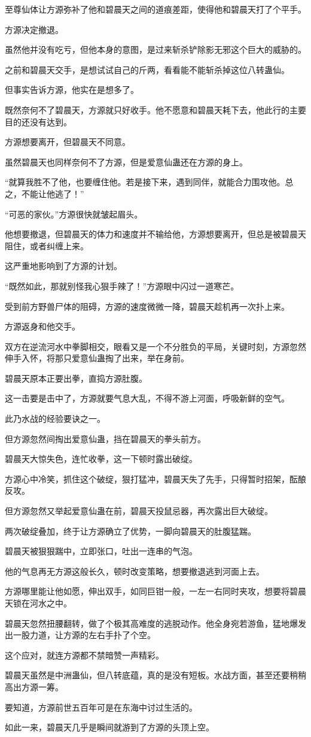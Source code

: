 \begin{this_body}
至尊仙体让方源弥补了他和碧晨天之间的道痕差距，使得他和碧晨天打了个平手。

方源决定撤退。

虽然他并没有吃亏，但他本身的意图，是过来斩杀铲除影无邪这个巨大的威胁的。

之前和碧晨天交手，是想试试自己的斤两，看看能不能斩杀掉这位八转蛊仙。

但事实告诉方源，他实在是想多了。

既然奈何不了碧晨天，方源就只好收手。他不愿意和碧晨天耗下去，他此行的主要目的还没有达到。

方源想要离开，但碧晨天不同意。

虽然碧晨天也同样奈何不了方源，但是爱意仙蛊还在方源的身上。

“就算我胜不了他，也要缠住他。若是接下来，遇到同伴，就能合力围攻他。总之，不能让他逃了！”

“可恶的家伙。”方源很快就皱起眉头。

他想要撤退，但碧晨天的体力和速度并不输给他，方源想要离开，但总是被碧晨天阻住，或者纠缠上来。

这严重地影响到了方源的计划。

“既然如此，那就别怪我心狠手辣了！”方源眼中闪过一道寒芒。

受到前方野兽尸体的阻碍，方源的速度微微一降，碧晨天趁机再一次扑上来。

方源返身和他交手。

双方在逆流河水中拳脚相交，眼看又是一个不分胜负的平局，关键时刻，方源忽然伸手入怀，将那只爱意仙蛊掏了出来，举在身前。

碧晨天原本正要出拳，直捣方源肚腹。

这一击要是击中了，方源就要气息大乱，不得不游上河面，呼吸新鲜的空气。

此乃水战的经验要诀之一。

但方源忽然间掏出爱意仙蛊，挡在碧晨天的拳头前方。

碧晨天大惊失色，连忙收拳，这一下顿时露出破绽。

方源心中冷笑，抓住这个破绽，狠打猛冲，碧晨天失了先手，只得暂时招架，酝酿反攻。

但方源忽然又举起爱意仙蛊在前，碧晨天投鼠忌器，再次露出巨大破绽。

两次破绽叠加，终于让方源确立了优势，一脚向碧晨天的肚腹猛踹。

碧晨天被狠狠踹中，立即张口，吐出一连串的气泡。

他的气息再无方源这般长久，顿时改变策略，想要撤退逃到河面上去。

方源哪里能让他如愿，伸出双手，如同巨钳一般，一左一右同时夹攻，想要将碧晨天锁在河水之中。

碧晨天忽然扭腰翻转，做了个极其高难度的逃脱动作。他全身宛若游鱼，猛地爆发出一股力道，让方源的左右手扑了个空。

这个应对，就连方源都不禁暗赞一声精彩。

碧晨天虽然是中洲蛊仙，但八转底蕴，真的是没有短板。水战方面，甚至还要稍稍高出方源一筹。

要知道，方源前世五百年可是在东海中讨过生活的。

如此一来，碧晨天几乎是瞬间就游到了方源的头顶上空。

\end{this_body}


